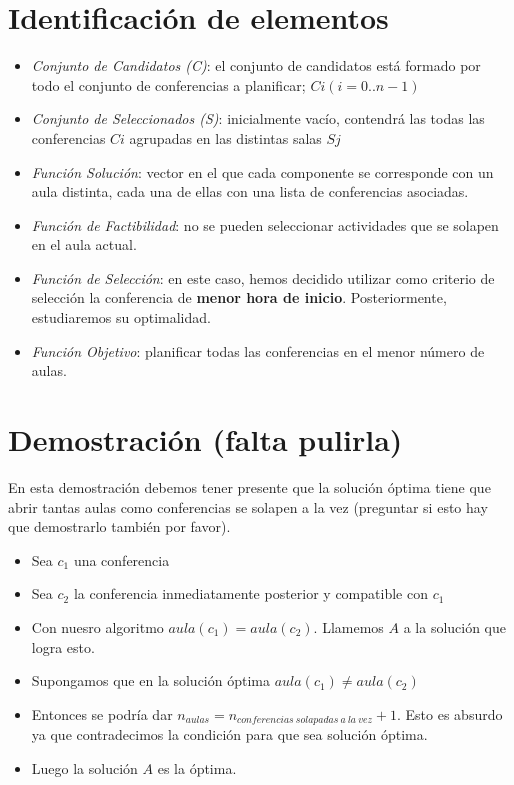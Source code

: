 \documentclass{article}
\begin{document}
	\section{Identificación de elementos}
	\begin{itemize}
		\item \textit{Conjunto de Candidatos (C)}: el conjunto de candidatos está formado por todo el conjunto de conferencias a planificar; $Ci (i=0..n-1)$
		
		\item \textit{Conjunto de Seleccionados (S)}: inicialmente vacío, contendrá las todas las conferencias $Ci$ agrupadas en las distintas salas $Sj$
		
		\item \textit{Función Solución}: vector en el que cada componente se corresponde con un aula distinta, cada una de ellas con una lista de conferencias asociadas.
		
		\item \textit{Función de Factibilidad}: no se pueden seleccionar actividades que se solapen en el aula actual.
		
		\item \textit{Función de Selección}: en este caso, hemos decidido utilizar como criterio de selección la conferencia de \textbf{menor hora de inicio}. Posteriormente, estudiaremos su optimalidad.
		
		\item \textit{Función Objetivo}: planificar todas las conferencias en el menor número de aulas.
	\end{itemize}

	
	\section{Demostración (falta pulirla)}
	En esta demostración debemos tener presente que la solución óptima tiene que abrir tantas aulas como conferencias se solapen a la vez (preguntar si esto hay que demostrarlo también por favor).
	\begin{itemize}
		
		\item Sea $c_1$ una conferencia
		\item Sea $c_2$ la conferencia inmediatamente posterior y compatible con $c_1$
		\item Con nuesro algoritmo $aula(c_1)=aula(c_2)$. Llamemos $A$ a la solución que logra esto.
		\item Supongamos que en la solución óptima $aula(c_1) \neq aula(c_2)$
		\item Entonces se podría dar $n_{aulas}=n_{conferencias\ solapadas\ a\ la\ vez}+1$. Esto es absurdo ya que contradecimos la condición para que sea solución óptima.
		\item Luego la solución $A$ es la óptima.
	\end{itemize}
	
\end{document}
